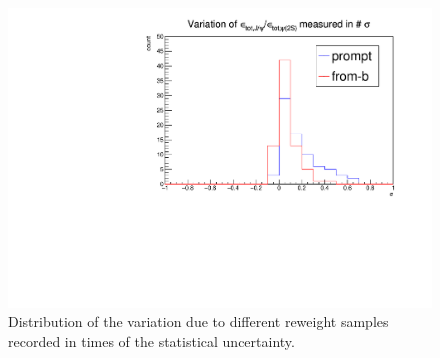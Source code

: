 \begin{figure}[h]
  \begin{center}
	  \includegraphics[width=0.6\linewidth]{pdf/HighLow.pdf}
  \end{center}
\caption{
	Distribution of the variation due to different reweight samples recorded in times of the statistical uncertainty.}
\label{HighLow}
\end{figure}

